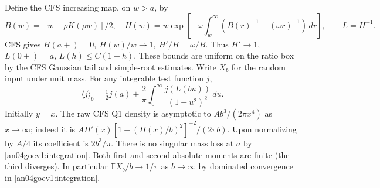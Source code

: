 \documentclass[11pt]{article}
\newcommand{\dd}{\,d}\newcommand{\E}{\mathbb E}
\begin{document}
Define the CFS increasing map, on \(w>a\), by
\[
 B(w)=[w-\rho K(\rho w)]/2,\quad
 H(w)=w\exp\left[-\omega\int_w^\infty
       (B(r)^{-1}-(\omega r)^{-1})\,dr\right],\qquad L=H^{-1}.
\]
CFS gives \(H(a+)=0,\ H(w)/w\to1,\ H'/H=\omega/B\). Thus
\(H'\to1\), \(L(0+)=a\), \(L(h)\le C(1+h)\). These bounds are
uniform on the ratio box by the CFS Gaussian tail and simple-root
estimates. Write \(X_b\) for the random input under unit mass. For
any integrable test function \(j\),
\begin{equation}\label{an04goev1:integration}
 \langle j\rangle_b=\tfrac12 j(a)+\frac2\pi\int_0^\infty
                    \frac{j(L(bu))}{(1+u^2)^2}\dd u .
\end{equation}
Initially \(y=x\). The raw CFS Q1 density is asymptotic to
\(Ab^3/(2\pi x^4)\) as \(x\to\infty\); indeed it is
\(A H'(x)[1+(H(x)/b)^2]^{-2}/(2\pi b)\). Upon normalizing by
\(A/4\) its coefficient is \(2b^3/\pi\). There is no singular mass
loss at \(a\) by \eqref{an04goev1:integration}. Both first and second
absolute moments are finite (the third diverges). In particular
\(\E X_b/b\to1/\pi\) as \(b\to\infty\) by dominated
convergence in \eqref{an04goev1:integration}.
\end{document}
